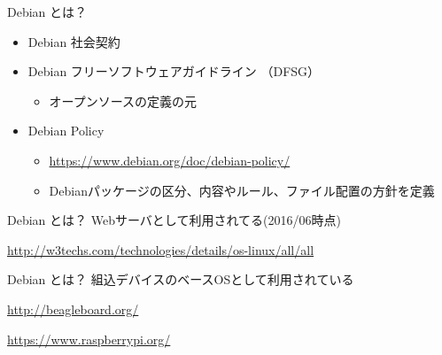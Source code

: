 \documentclass[cjk,dvipdfmx,10pt,compress,%
hyperref={bookmarks=true,bookmarksnumbered=true,bookmarksopen=false,%
colorlinks=false,%
pdftitle={第 132 回 関西 Debian 勉強会},%
pdfauthor={かわだ},%
pdfsubject={資料},%
}]{beamer}
\begin{document}
\begin{frame}{Debian とは？}
\begin{itemize}
  \item Debian 社会契約
  \item Debian フリーソフトウェアガイドライン （DFSG）
    \begin{itemize}
      \item オープンソースの定義の元
    \end{itemize}
  \item Debian Policy
    \begin{itemize}
      \item \url{https://www.debian.org/doc/debian-policy/}
      \item Debianパッケージの区分、内容やルール、ファイル配置の方針を定義
    \end{itemize}
\end{itemize}
\end{frame}


\begin{frame}{Debian とは？}
Webサーバとして利用されてる(2016/06時点)
  \begin{center}
  \end{center}
  \tiny{\url{http://w3techs.com/technologies/details/os-linux/all/all}}
\end{frame}

\begin{frame}{Debian とは？}
組込デバイスのベースOSとして利用されている
 \begin{center}
 \end{center}
 \url{http://beagleboard.org/}

 \begin{center}
 \end{center}
 \url{https://www.raspberrypi.org/}
\end{frame}
\end{document}
